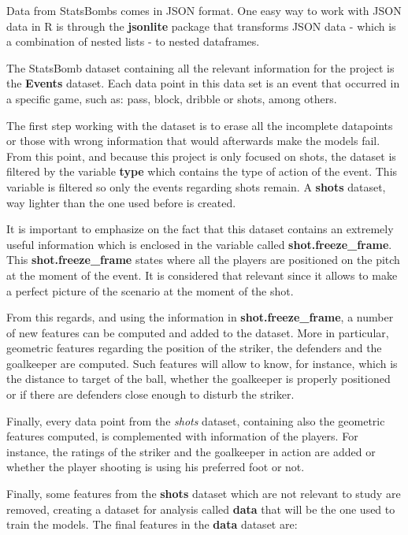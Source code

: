 \documentclass[]{article}
\begin{document}
Data from StatsBombs comes in JSON format. One easy way to work with
JSON data in R is through the \textbf{jsonlite} package that transforms
JSON data - which is a combination of nested lists - to nested
dataframes.

The StatsBomb dataset containing all the relevant information for the
project is the \textbf{Events} dataset. Each data point in this data set
is an event that occurred in a specific game, such as: pass, block,
dribble or shots, among others.

The first step working with the dataset is to erase all the incomplete
datapoints or those with wrong information that would afterwards make
the models fail. From this point, and because this project is only
focused on shots, the dataset is filtered by the variable \textbf{type}
which contains the type of action of the event. This variable is
filtered so only the events regarding shots remain. A \textbf{shots}
dataset, way lighter than the one used before is created.

It is important to emphasize on the fact that this dataset contains an
extremely useful information which is enclosed in the variable called
\textbf{shot.freeze\_frame}. This \textbf{shot.freeze\_frame} states
where all the players are positioned on the pitch at the moment of the
event. It is considered that relevant since it allows to make a perfect
picture of the scenario at the moment of the shot.

From this regards, and using the information in
\textbf{shot.freeze\_frame}, a number of new features can be computed
and added to the dataset. More in particular, geometric features
regarding the position of the striker, the defenders and the goalkeeper
are computed. Such features will allow to know, for instance, which is
the distance to target of the ball, whether the goalkeeper is properly
positioned or if there are defenders close enough to disturb the
striker.

Finally, every data point from the \emph{shots} dataset, containing also
the geometric features computed, is complemented with information of the
players. For instance, the ratings of the striker and the goalkeeper in
action are added or whether the player shooting is using his preferred
foot or not.

Finally, some features from the \textbf{shots} dataset which are not
relevant to study are removed, creating a dataset for analysis called
\textbf{data} that will be the one used to train the models. The final
features in the \textbf{data} dataset are:
\end{document}
